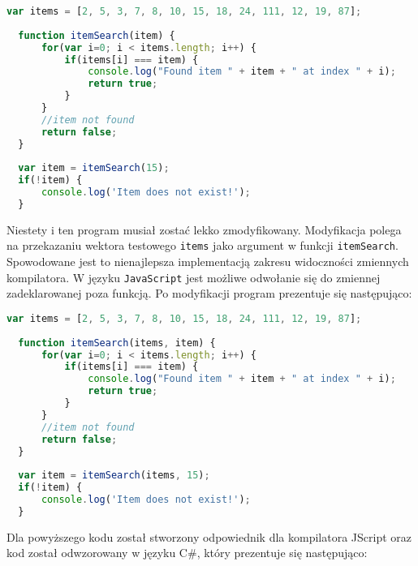 \begin{lstlisting}[language=JavaScript, caption={Algorytm przeszukiwania. Źródło: \url{https://www.scriptonitejs.com/javascript-searching-algorithms/}}, label=alg:alg1]
  var items = [2, 5, 3, 7, 8, 10, 15, 18, 24, 111, 12, 19, 87];
  
  function itemSearch(item) {
      for(var i=0; i < items.length; i++) {
          if(items[i] === item) {
              console.log("Found item " + item + " at index " + i);
              return true;
          }
      }
      //item not found 
      return false;
  }
  
  var item = itemSearch(15);
  if(!item) {
      console.log('Item does not exist!');
  }
\end{lstlisting}

\par Niestety i ten program musiał zostać lekko zmodyfikowany. Modyfikacja polega na przekazaniu wektora testowego \texttt{items} jako argument w funkcji \texttt{itemSearch}. Spowodowane jest to nienajlepsza implementacją zakresu widoczności zmiennych kompilatora. W języku \texttt{JavaScript} jest możliwe odwołanie się do zmiennej zadeklarowanej poza funkcją. Po modyfikacji program prezentuje się następująco:

\begin{lstlisting}[language=JavaScript, caption={Zmodyfikowany kod programu przeszukiwania.}, label=alg:alg1]
  var items = [2, 5, 3, 7, 8, 10, 15, 18, 24, 111, 12, 19, 87];
  
  function itemSearch(items, item) {
      for(var i=0; i < items.length; i++) {
          if(items[i] === item) {
              console.log("Found item " + item + " at index " + i);
              return true;
          }
      }
      //item not found 
      return false;
  }
  
  var item = itemSearch(items, 15);
  if(!item) {
      console.log('Item does not exist!');
  }
\end{lstlisting}

\par Dla powyższego kodu został stworzony odpowiednik dla kompilatora JScript oraz kod został odwzorowany w języku C\#, który prezentuje się następująco:

